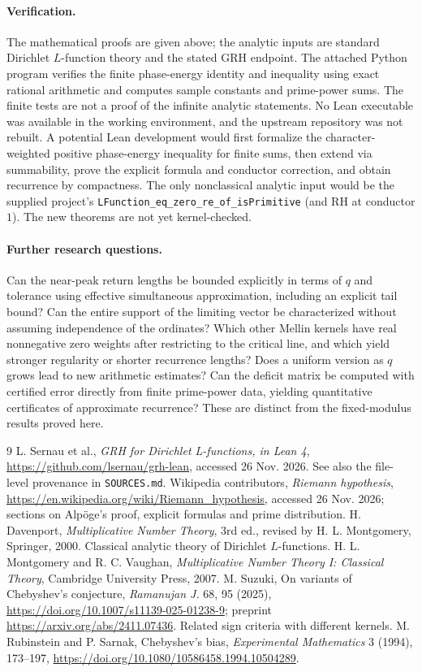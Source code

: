 \documentclass[11pt]{article}
\theoremstyle{remark}\newtheorem{remark}[theorem]{Remark}
\begin{document}
\paragraph{Verification.} The mathematical proofs are given above; the analytic inputs are standard Dirichlet $L$-function theory and the stated GRH endpoint. The attached Python program verifies the finite phase-energy identity and inequality using exact rational arithmetic and computes sample constants and prime-power sums. The finite tests are not a proof of the infinite analytic statements. No Lean executable was available in the working environment, and the upstream repository was not rebuilt. A potential Lean development would first formalize the character-weighted positive phase-energy inequality for finite sums, then extend via summability, prove the explicit formula and conductor correction, and obtain recurrence by compactness. The only nonclassical analytic input would be the supplied project's \texttt{LFunction\_eq\_zero\_re\_of\_isPrimitive} (and RH at conductor $1$). The new theorems are not yet kernel-checked.

\paragraph{Further research questions.}
Can the near-peak return lengths be bounded explicitly in terms of $q$ and tolerance using effective simultaneous approximation, including an explicit tail bound? Can the entire support of the limiting vector be characterized without assuming independence of the ordinates? Which other Mellin kernels have real nonnegative zero weights after restricting to the critical line, and which yield stronger regularity or shorter recurrence lengths? Does a uniform version as $q$ grows lead to new arithmetic estimates? Can the deficit matrix be computed with certified error directly from finite prime-power data, yielding quantitative certificates of approximate recurrence? These are distinct from the fixed-modulus results proved here.

\begin{thebibliography}{9}
 L. Sernau et al., \emph{GRH for Dirichlet L-functions, in Lean 4}, \url{https://github.com/lsernau/grh-lean}, accessed 26 Nov. 2026. See also the file-level provenance in \texttt{SOURCES.md}.
 Wikipedia contributors, \emph{Riemann hypothesis}, \url{https://en.wikipedia.org/wiki/Riemann_hypothesis}, accessed 26 Nov. 2026; sections on Alp\"oge's proof, explicit formulas and prime distribution.
 H. Davenport, \emph{Multiplicative Number Theory}, 3rd ed., revised by H. L. Montgomery, Springer, 2000. Classical analytic theory of Dirichlet $L$-functions.
 H. L. Montgomery and R. C. Vaughan, \emph{Multiplicative Number Theory I: Classical Theory}, Cambridge University Press, 2007.
 M. Suzuki, On variants of Chebyshev's conjecture, \emph{Ramanujan J.} 68, 95 (2025), \url{https://doi.org/10.1007/s11139-025-01238-9}; preprint \url{https://arxiv.org/abs/2411.07436}. Related sign criteria with different kernels.
 M. Rubinstein and P. Sarnak, Chebyshev's bias, \emph{Experimental Mathematics} 3 (1994), 173--197, \url{https://doi.org/10.1080/10586458.1994.10504289}.
\end{thebibliography}
\end{document}
